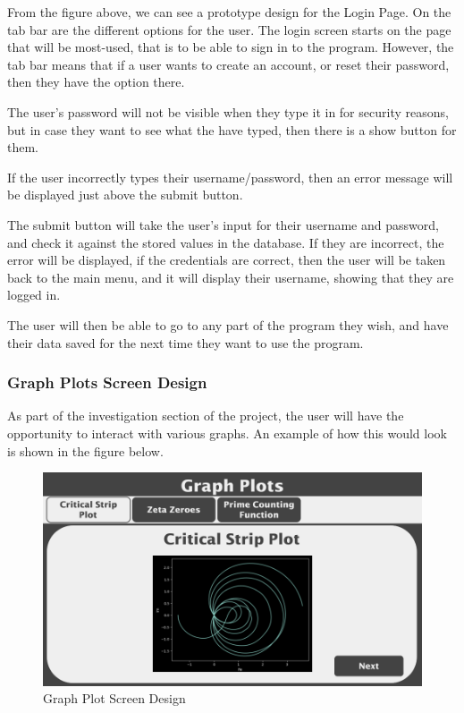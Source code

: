 \documentclass[12pt]{article}
\begin{document}
From the figure above, we can see a prototype design for the Login Page.
On the tab bar are the different options for the user. The login screen starts on the page that will be most-used, that is to be able to sign in to the program. However, the tab bar means that if a user wants to create an account, or reset their password, then they have the option there.

The user's password will not be visible when they type it in for security reasons, but in case they want to see what the have typed, then there is a show button for them.

If the user incorrectly types their username/password, then an error message will be displayed just above the submit button.

The submit button will take the user's input for their username and password, and check it against the stored values in the database. If they are incorrect, the error will be displayed, if the credentials are correct, then the user will be taken back to the main menu, and it will display their username, showing that they are logged in.

The user will then be able to go to any part of the program they wish, and have their data saved for the next time they want to use the program.

\clearpage

\subsubsection{Graph Plots Screen Design}

As part of the investigation section of the project, the user will have the opportunity to interact with various graphs. An example of how this would look is shown in the figure below.

\begin{figure}[ht]
    \centering
    \includegraphics[scale=0.18]{graph-plots-screen-design}
    \caption{Graph Plot Screen Design}
\end{figure}
\end{document}
